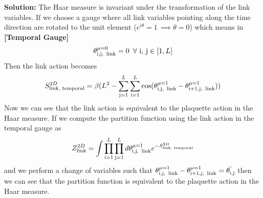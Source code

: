 \textbf{Solution:}
The Haar measure is invariant under the transformation of the link variables. If we choose a gauge where all link variables pointing along the time direction are rotated to the unit element ($e^{i \theta}= 1\,\implies \theta=0$) which means in \textbf{[Temporal Gauge]} $$\theta^{\mu=0}_{\text{i,j,\, link}} = 0 \,\,\,\forall\,\,\text{i, j}\in[1, L]$$
Then the link action becomes
\begin{equation}
    S_{\text{link, temporal}}^{2D} = \beta(L^2- \sum_{\text{j}=1}^{L}\sum_{\text{i}=1}^{L}\cos(\theta_{\text{i,j, \,link}}^{\mu=1}-\theta_{\text{i+1,j, \,link}}^{\mu=1}))
\end{equation}
Now we can see that the link action is equivalent to the plaquette action in the Haar measure. If we compute the partition function using the link action in the temporal gauge as
\begin{equation}
    Z^{2D}_{\text{link}} = \int \prod_{\text{i}=1}^{L}\prod_{\text{j}=1}^{L}d\theta_{\text{i,j, \,link}}^{\mu=1}e^{-S_{\text{link, temporal}}^{2D}}
\end{equation}
and we perform a change of variables such that $\theta_{\text{i,j, \,link}}^{\mu=1}  - \theta_{\text{i+1,j, \,link}}^{\mu=1}= \theta^{'}_{\text{i,j}}$ then we can see that the partition function is equivalent to the plaquette action in the Haar measure.

